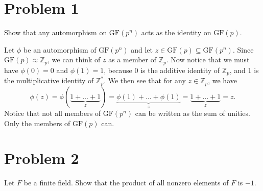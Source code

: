 \documentclass{article}
\begin{document}
\newcommand{\Z}{\mathbb{Z}}
\newcommand{\Q}{\mathbb{Q}}
\newcommand{\GF}{\mbox{GF}}
\newcommand{\al}{\alpha}

\section*{Problem 1}

Show that any automorphism on $\GF(p^n)$ acts as the
identity on $\GF(p)$.

Let $\phi$ be an automorphism of $\GF(p^n)$ and let $z\in\GF(p)\subseteq\GF(p^n)$.
Since $\GF(p)\approx\Z_p$, we can think of $z$ as a member of $\Z_p$.
Now notice that we must have $\phi(0)=0$ and $\phi(1)=1$, because
0 is the additive identity of $\Z_p$, and 1 is the multiplicative
identity of $\Z_p^*$.  We then see that for any $z\in\Z_p$, we have
\begin{equation*}
\phi(z)=\phi(\underbrace{1+\dots+1}_z)=\underbrace{\phi(1)+\dots+\phi(1)}_z=\underbrace{1+\dots+1}_z=z.
\end{equation*}
Notice that not all members of $\GF(p^n)$ can be written as the sum of unities.
Only the members of $\GF(p)$ can.



\section*{Problem 2}

Let $F$ be a finite field.  Show that the product of all nonzero elements of $F$ is $-1$.
\end{document}
